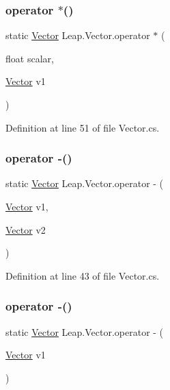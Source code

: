 \subsubsection{\texorpdfstring{operator $\ast$()}{operator *()}\hspace{0.1cm}{\footnotesize\ttfamily [2/2]}}
{\footnotesize\ttfamily static \mbox{\hyperlink{struct_leap_1_1_vector}{Vector}} Leap.\+Vector.\+operator $\ast$ (\begin{DoxyParamCaption}\item[{float}]{scalar,  }\item[{\mbox{\hyperlink{struct_leap_1_1_vector}{Vector}}}]{v1 }\end{DoxyParamCaption})\hspace{0.3cm}{\ttfamily [static]}}



Definition at line 51 of file Vector.\+cs.

\mbox{\label{struct_leap_1_1_vector_ac35b7560d4ac5acb9217120aa6281f41}} 
\subsubsection{\texorpdfstring{operator -\/()}{operator -()}\hspace{0.1cm}{\footnotesize\ttfamily [1/2]}}
{\footnotesize\ttfamily static \mbox{\hyperlink{struct_leap_1_1_vector}{Vector}} Leap.\+Vector.\+operator -\/ (\begin{DoxyParamCaption}\item[{\mbox{\hyperlink{struct_leap_1_1_vector}{Vector}}}]{v1,  }\item[{\mbox{\hyperlink{struct_leap_1_1_vector}{Vector}}}]{v2 }\end{DoxyParamCaption})\hspace{0.3cm}{\ttfamily [static]}}



Definition at line 43 of file Vector.\+cs.

\mbox{\label{struct_leap_1_1_vector_ab08ec541871ec6fefb7f66331fdb6f0d}} 
\subsubsection{\texorpdfstring{operator -\/()}{operator -()}\hspace{0.1cm}{\footnotesize\ttfamily [2/2]}}
{\footnotesize\ttfamily static \mbox{\hyperlink{struct_leap_1_1_vector}{Vector}} Leap.\+Vector.\+operator -\/ (\begin{DoxyParamCaption}\item[{\mbox{\hyperlink{struct_leap_1_1_vector}{Vector}}}]{v1 }\end{DoxyParamCaption})\hspace{0.3cm}{\ttfamily [static]}}



